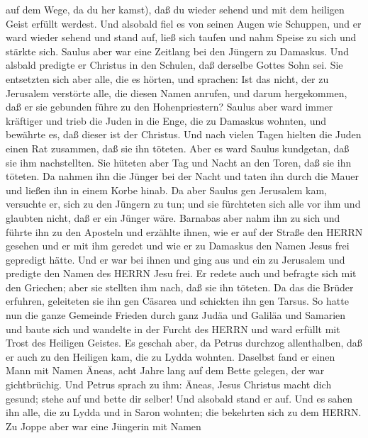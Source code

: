 auf dem Wege, da du her kamst), daß du wieder sehend und mit dem
heiligen Geist erfüllt werdest.  Und alsobald fiel es von
seinen Augen wie Schuppen, und er ward wieder sehend  und
stand auf, ließ sich taufen und nahm Speise zu sich und stärkte sich.
Saulus aber war eine Zeitlang bei den Jüngern zu Damaskus. 
Und alsbald predigte er Christus in den Schulen, daß derselbe Gottes
Sohn sei.  Sie entsetzten sich aber alle, die es hörten,
und sprachen: Ist das nicht, der zu Jerusalem verstörte alle, die diesen
Namen anrufen, und darum hergekommen, daß er sie gebunden führe zu den
Hohenpriestern?  Saulus aber ward immer kräftiger und trieb
die Juden in die Enge, die zu Damaskus wohnten, und bewährte es, daß
dieser ist der Christus.  Und nach vielen Tagen hielten die
Juden einen Rat zusammen, daß sie ihn töteten.  Aber es
ward Saulus kundgetan, daß sie ihm nachstellten. Sie hüteten aber Tag
und Nacht an den Toren, daß sie ihn töteten.  Da nahmen ihn
die Jünger bei der Nacht und taten ihn durch die Mauer und ließen ihn in
einem Korbe hinab.  Da aber Saulus gen Jerusalem kam,
versuchte er, sich zu den Jüngern zu tun; und sie fürchteten sich alle
vor ihm und glaubten nicht, daß er ein Jünger wäre. 
Barnabas aber nahm ihn zu sich und führte ihn zu den Aposteln und
erzählte ihnen, wie er auf der Straße den HERRN gesehen und er mit ihm
geredet und wie er zu Damaskus den Namen Jesus frei gepredigt hätte.
 Und er war bei ihnen und ging aus und ein zu Jerusalem und
predigte den Namen des HERRN Jesu frei.  Er redete auch und
befragte sich mit den Griechen; aber sie stellten ihm nach, daß sie ihn
töteten.  Da das die Brüder erfuhren, geleiteten sie ihn
gen Cäsarea und schickten ihn gen Tarsus.  So hatte nun die
ganze Gemeinde Frieden durch ganz Judäa und Galiläa und Samarien und
baute sich und wandelte in der Furcht des HERRN und ward erfüllt mit
Trost des Heiligen Geistes.  Es geschah aber, da Petrus
durchzog allenthalben, daß er auch zu den Heiligen kam, die zu Lydda
wohnten.  Daselbst fand er einen Mann mit Namen Äneas, acht
Jahre lang auf dem Bette gelegen, der war gichtbrüchig. 
Und Petrus sprach zu ihm: Äneas, Jesus Christus macht dich gesund; stehe
auf und bette dir selber! Und alsobald stand er auf.  Und
es sahen ihn alle, die zu Lydda und in Saron wohnten; die bekehrten sich
zu dem HERRN.  Zu Joppe aber war eine Jüngerin mit Namen
